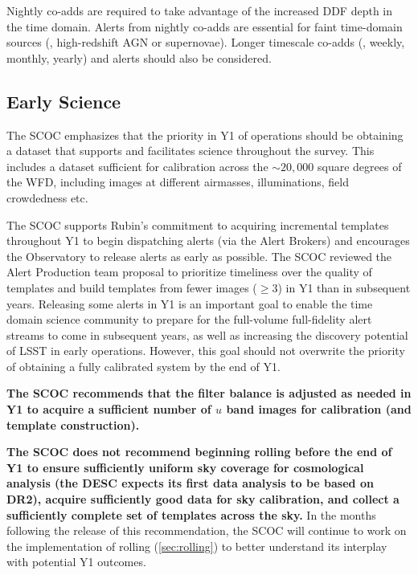 Nightly co-adds are required to take advantage of the increased DDF depth in the time domain. Alerts from nightly co-adds are essential for faint time-domain sources (\eg , high-redshift AGN or supernovae). Longer timescale co-adds (\eg , weekly, monthly, yearly) and alerts should also be considered.





\FloatBarrier

\subsection{Early Science}\label{sec:early}

 The SCOC emphasizes that the priority in Y1 of operations should be obtaining a dataset that supports and facilitates science throughout the survey. This includes a dataset sufficient for calibration across the $\sim 20,000$ square degrees of the WFD, including images at different airmasses, illuminations, field crowdedness etc. 
 
 The SCOC supports Rubin's commitment to acquiring incremental templates throughout Y1 to begin dispatching alerts (via the Alert Brokers) and encourages the Observatory to release alerts as early as possible. The SCOC reviewed the Alert Production team proposal to prioritize timeliness over the quality of templates and build templates from fewer images ($\geq 3$) in Y1 than in subsequent years. Releasing some alerts in Y1 is an important goal to enable the time domain science community to prepare for the full-volume full-fidelity alert streams to come in subsequent years, as well as increasing the discovery potential of LSST in early operations. However, this goal should not overwrite the priority of obtaining a fully calibrated system by the end of Y1.

 {\bf The SCOC recommends that the filter balance is adjusted as needed in Y1 to acquire a sufficient number of $u$ band images for calibration (and template construction). }

 {\bf The SCOC does not recommend beginning rolling before the end of Y1 to ensure sufficiently uniform sky coverage for cosmological analysis (the DESC expects its first data analysis to be based on DR2), acquire sufficiently good data for sky calibration, and collect a 
 sufficiently complete set of templates across the sky.} In the months following the release of this recommendation, the SCOC will continue to work on the implementation of rolling (\autoref{sec:rolling}) to better understand its interplay with potential Y1 outcomes. 

